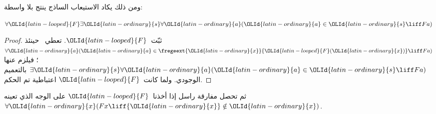 \documentclass[../../../include/open-logic-section]{subfiles}
\begin{document}
ومن ذلك يكاد الاستيعاب الساذج ينتج بلا واسطة:

\begin{lem}
$\forall {\OLId{latin-looped}{F}} \exists {\OLId{latin-ordinary}{s}} \forall {\OLId{latin-ordinary}{a}} ({\OLId{latin-ordinary}{a}} \in {\OLId{latin-ordinary}{s}} \liff Fa)$
\end{lem}

\begin{proof}
ثبّت~${\OLId{latin-looped}{F}}$. تعطي~ حينئذ
$\forall {\OLId{latin-ordinary}{a}} ({\OLId{latin-ordinary}{a}} \in \fregeext{{\OLId{latin-ordinary}{x}}}{{\OLId{latin-looped}{F}}({\OLId{latin-ordinary}{x}})} \liff Fa)$؛ فيلزم عنها
$\exists {\OLId{latin-ordinary}{s}}\forall {\OLId{latin-ordinary}{a}}({\OLId{latin-ordinary}{a}} \in {\OLId{latin-ordinary}{s}} \liff Fa)$ بالتعميم الوجودي. ولما كانت~${\OLId{latin-looped}{F}}$
اعتباطية تم الحكم.
\end{proof}

ثم تحصل مفارقة راسل إذا أخذنا~${\OLId{latin-looped}{F}}$ على الوجه الذي تعينه
$\forall {\OLId{latin-ordinary}{x}}(Fx \liff {\OLId{latin-ordinary}{x}} \notin {\OLId{latin-ordinary}{x}})$.
\end{document}
